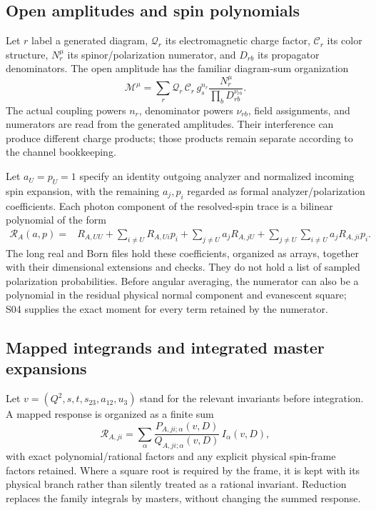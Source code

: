 \documentclass[11pt,a4paper]{article}
\begin{document}
\subsection{Open amplitudes and spin polynomials}
Let $r$ label a generated diagram, $\mathcal Q_r$ its electromagnetic charge factor, $\mathcal C_r$ its color structure, $N_r^\mu$ its spinor/polarization numerator, and $D_{rb}$ its propagator denominators. The open amplitude has the familiar diagram-sum organization
\begin{equation}
 \mathcal M^\mu=\sum_r
 \mathcal Q_r\,\mathcal C_r\,g_s^{n_r}
 \frac{N_r^\mu}{\prod_b D_{rb}^{\nu_{rb}}}.
\end{equation}
The actual coupling powers $n_r$, denominator powers $\nu_{rb}$, field assignments, and numerators are read from the generated amplitudes. Their interference can produce different charge products; those products remain separate according to the channel bookkeeping.

Let $a_U=p_U=1$ specify an identity outgoing analyzer and normalized incoming spin expansion, with the remaining $a_j,p_i$ regarded as formal analyzer/polarization coefficients. Each photon component of the resolved-spin trace is a bilinear polynomial of the form
\begin{align}
 \mathcal R_A(a,p)={}&R_{A,UU}
 +\sum_{i\ne U}R_{A,Ui}p_i
 +\sum_{j\ne U}a_jR_{A,jU}
 +\sum_{j\ne U}\sum_{i\ne U}a_jR_{A,ji}p_i.
\end{align}
The long real and Born files hold these coefficients, organized as arrays, together with their dimensional extensions and checks. They do not hold a list of sampled polarization probabilities. Before angular averaging, the numerator can also be a polynomial in the residual physical normal component and evanescent square; S04 supplies the exact moment for every term retained by the numerator.

\subsection{Mapped integrands and integrated master expansions}
Let $v=(Q^2,s,t,s_{23},a_{12},u_3)$ stand for the relevant invariants before integration. A mapped response is organized as a finite sum
\begin{equation}
 \mathcal R_{A,ji}=\sum_{\alpha}
 \frac{P_{A,ji;\alpha}(v,D)}{Q_{A,ji;\alpha}(v,D)}\,
 I_\alpha(v,D),
\end{equation}
with exact polynomial/rational factors and any explicit physical spin-frame factors retained. Where a square root is required by the frame, it is kept with its physical branch rather than silently treated as a rational invariant. Reduction replaces the family integrals by masters, without changing the summed response.
\end{document}
